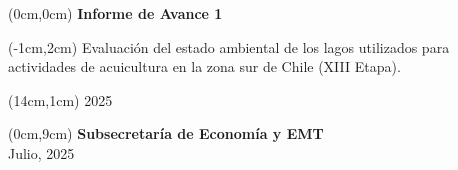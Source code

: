 \thispagestyle{empty}

\begin{textblock*}{10cm}(0cm,0cm)
  {\centering\fontsize{28}{32}\selectfont\color{white}\bfseries Informe de Avance 1}
\end{textblock*}


\begin{textblock*}{10.5cm}(-1cm,2cm)
  {\centering
   \fontsize{20}{31}\selectfont\color{white}
   Evaluación del estado ambiental
   de los lagos utilizados para
   actividades de acuicultura en la
   zona sur de Chile (XIII Etapa).}
\end{textblock*}

\begin{textblock*}{5cm}(14cm,1cm)
  {\centering
   \fontsize{32}{48}\selectfont\color{black}2025}
\end{textblock*}

\begin{textblock*}{10cm}(0cm,9cm)
  {\centering
   \fontsize{14}{48}\selectfont\color{white}\bfseries Subsecretaría de Economía y EMT}\\[0.5ex]
  {\centering
   \fontsize{12}{48}\selectfont\color{white}Julio, 2025}
\end{textblock*}


